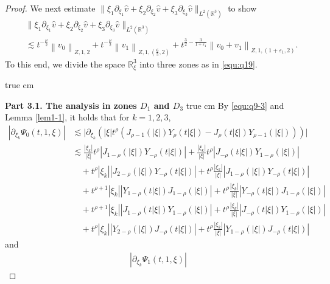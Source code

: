 \documentclass[11pt,twoside]{article}
\newcommand{\R}{\mathbb R}
\newcommand{\p}{\partial}
\newcommand{\f}{\frac}
\theoremstyle{plain}
\theoremstyle{definition}
\theoremstyle{remark}
\numberwithin{equation}{section}
\begin{document}
\begin{proof}
We next estimate $\|\xi_1\p_{\xi_1}\hat{v}+\xi_2\p_{\xi_2}\hat{v}+\xi_3\p_{\xi_3}\hat{v}\|_{L^2(\R^3)}$
to show
\begin{equation}\label{e:q31}
\begin{aligned}
&\|\xi_1\p_{\xi_1}\hat{v}+\xi_2\p_{\xi_2}\hat{v}+\xi_3\p_{\xi_3}\hat{v}\|_{L^2(\R^3)} \\&\lesssim t^{-\f{\mu}{2}}\left\|v_0\right\|_{Z, 1, 2}+t^{-\f{\mu}{2}}\left\|v_1\right\|_{Z, 1,(\f65, 2)}+t^{\f32-\f{3}{1+\varepsilon_1}}\left\|v_0+v_1\right\|_{Z, 1,(1+\varepsilon_1, 2)}.
\end{aligned}
\end{equation}
To this end, we
divide the space $\R_{\xi}^3$ into three zones as in \eqref{equ:q19}.

 true cm

{\bf Part 3.1.  The analysis  in zones $D_1$ and  $D_3$}
 true cm
By \eqref{equ:q9-3} and Lemma \ref{lem1-1}, it holds   that for $k=1,2,3$,
\begin{equation}\label{e:q32}
\begin{aligned}
|\partial_{\xi_k} \Psi_0(t, 1, \xi)|
& \lesssim  \big| \partial_{\xi_k} \left( |\xi| t^\rho \left( J_{\rho-1}(|\xi|) Y_\rho(t|\xi|)
- J_\rho(t|\xi|) Y_{\rho-1}(|\xi|) \right) \right) \big| \\
& \lesssim  \frac{|\xi_k|}{|\xi|} t^\rho \left| J_{1-\rho}(|\xi|) Y_{-\rho}(t|\xi|) \right|
+ \frac{|\xi_k|}{|\xi|} t^\rho \left| J_{-\rho}(t|\xi|) Y_{1-\rho}(|\xi|) \right| \\
& \quad + t^\rho |\xi_k| \left| J_{2-\rho}(|\xi|) Y_{-\rho}(t|\xi|) \right|
+ t^\rho \frac{|\xi_k|}{|\xi|} \left| J_{1-\rho}(|\xi|) Y_{-\rho}(t|\xi|) \right| \\
& \quad + t^{\rho+1} |\xi_k| \left| Y_{1-\rho}(t|\xi|) J_{1-\rho}(|\xi|) \right|
+ t^\rho \frac{|\xi_k|}{|\xi|} \left| Y_{-\rho}(t|\xi|) J_{1-\rho}(|\xi|) \right| \\
& \quad + t^{\rho+1} |\xi_k| \left| J_{1-\rho}(t|\xi|) Y_{1-\rho}(|\xi|) \right|
+ t^\rho \frac{|\xi_k|}{|\xi|} \left| J_{-\rho}(t|\xi|) Y_{1-\rho}(|\xi|) \right| \\
& \quad + t^\rho |\xi_k| \left| Y_{2-\rho}(|\xi|) J_{-\rho}(t|\xi|) \right|
+ t^\rho \frac{|\xi_k|}{|\xi|} \left| Y_{1-\rho}(|\xi|) J_{-\rho}(t|\xi|) \right|
\end{aligned}
\end{equation}
and
\begin{equation}\label{e:q33}
\begin{aligned}
|\partial_{\xi_k} \Psi_1(t, 1, \xi)|

\end{aligned}
\end{equation}
\end{proof}
\end{document}
